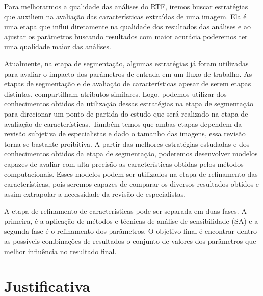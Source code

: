 \documentclass[a4paper,10pt]{article}
\begin{document}
Para melhorarmos a qualidade das análises do RTF, iremos buscar estratégias que auxiliem na avaliação das características extraídas de uma imagem. Ela é uma etapa que influi diretamente na qualidade dos resultados das análises e ao ajustar os parâmetros buscando resultados com maior acurácia poderemos ter uma qualidade maior das análises. 

Atualmente, na etapa de segmentação, algumas estratégias já foram utilizadas para avaliar o impacto dos parâmetros de entrada em um fluxo de trabalho. As etapas de segmentação e de avaliação de características apesar de serem etapas distintas, compartilham atributos similares. Logo, podemos utilizar dos conhecimentos obtidos da utilização dessas estratégias na etapa de segmentação para direcionar um ponto de partida do estudo que será realizado na etapa de avaliação de características. Também temos que ambas etapas dependem da revisão subjetiva de especialistas e dado o tamanho das imagens, essa revisão torna-se bastante proibitiva. A partir das melhores estratégias estudadas e dos conhecimentos obtidos da etapa de segmentação, poderemos desenvolver modelos capazes de avaliar com alta precisão as características obtidas pelos métodos computacionais. Esses modelos podem ser utilizados na etapa de refinamento das características, pois seremos capazes de comparar os diversos resultados obtidos e assim extrapolar a necessidade da revisão de especialistas.

A etapa de refinamento de características pode ser separada em duas fases. A primeira, é a aplicação de métodos e técnicas de análise de sensibilidade (SA) e a segunda fase é o refinamento dos parâmetros. O objetivo final é encontrar dentro as possíveis combinações de resultados o conjunto de valores dos parâmetros que melhor influência no resultado final.



\section{Justificativa}
\end{document}
